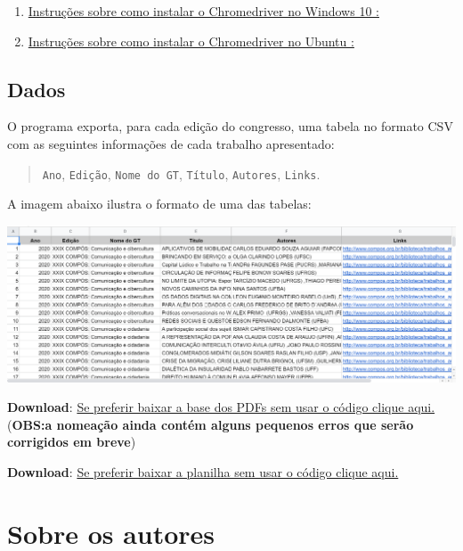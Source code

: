 \documentclass[
]{book}
\begin{document}
\begin{enumerate}
\def\labelenumi{\arabic{enumi}.}
\item
  \href{https://www.youtube.com/watch?v=dz59GsdvUF8}{Instruções sobre como instalar o Chromedriver no Windows 10 :}
\item
  \href{https://medium.com/@marco.conviccao/configurando-o-chromedriver-no-ubuntu-7baaf2be7c68}{Instruções sobre como instalar o Chromedriver no Ubuntu :}
\end{enumerate}

\hypertarget{dados-3}{%
\section{Dados}\label{dados-3}}

O programa exporta, para cada edição do congresso, uma tabela no formato CSV com as seguintes informações de cada trabalho apresentado:

\begin{quote}
\texttt{Ano}, \texttt{Edição}, \texttt{Nome\ do\ GT}, \texttt{Título}, \texttt{Autores}, \texttt{Links}.
\end{quote}

A imagem abaixo ilustra o formato de uma das tabelas:

\includegraphics{img/csv.png}

\textbf{Download}: \href{https://filesender.rnp.br/?s=download\&token=ae3e90f6-c8db-497f-a3e0-73958c634997}{Se preferir baixar a base dos PDFs sem usar o código clique aqui.}
(\textbf{OBS:a nomeação ainda contém alguns pequenos erros que serão corrigidos em breve})

\textbf{Download}: \href{https://docs.google.com/spreadsheets/d/1VXlCD9rak-ut3_5p6UFyzOfuSgpbBcl9KDHrXe53q-0/edit?usp=sharing}{Se preferir baixar a planilha sem usar o código clique aqui.}

\hypertarget{sobre-os-autores}{%
\chapter{Sobre os autores}\label{sobre-os-autores}}
\end{document}
